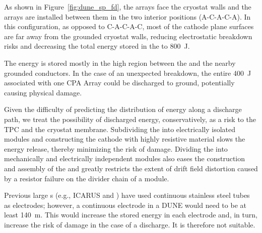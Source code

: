 As shown in Figure~\ref{fig:dune_sp_fd}, the  arrays face the cryostat walls and the  arrays are installed between them in the two interior positions (A-C-A-C-A).
In this configuration, as opposed to C-A-C-A-C,  most of the cathode plane surfaces are far away from the grounded cryostat walls, reducing electrostatic breakdown risks and decreasing the total energy stored in the \efield to \SI{800}{J}.

The energy is stored mostly in the high \efield{} region between the  and the nearby grounded conductors.  In the case of an unexpected  breakdown, the entire \SI{400}{J} associated with one CPA Array could be
discharged to ground,
potentially causing physical damage.


Given the difficulty of predicting the distribution of energy along a discharge path, we treat the possibility of discharged energy, conservatively, as a risk to the TPC and the cryostat membrane. 
Subdividing the  into electrically isolated modules and constructing the cathode with highly resistive material slows the energy release, thereby minimizing the risk of damage. Dividing the  into mechanically and electrically independent modules also eases the construction and assembly of the  and greatly restricts the extent of drift field distortion caused by a resistor failure on the divider chain of a  module.

Previous large \lartpc{}s (e.g., ICARUS and \microboone) have used continuous stainless steel tubes as electrodes;
however, a continuous electrode in a DUNE  would need to be at least \SI{140}{\m}. This would increase the stored energy in each electrode and, in turn, increase the risk of damage in the case of a discharge. It is therefore not suitable.

